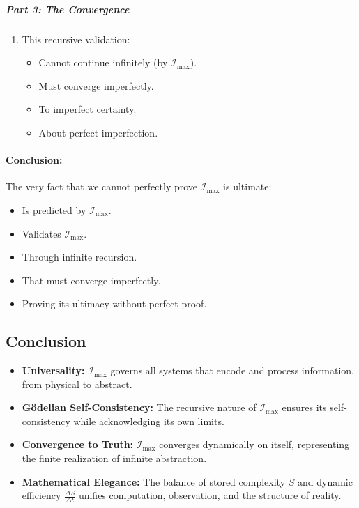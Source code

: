 \documentclass[12pt]{article}
\begin{document}
\subparagraph{Part 3: The Convergence}
\begin{enumerate}
    \item This recursive validation:
    \begin{itemize}
        \item Cannot continue infinitely (by \(\mathcal{I}_{\text{max}}\)).
        \item Must converge imperfectly.
        \item To imperfect certainty.
        \item About perfect imperfection.
    \end{itemize}
\end{enumerate}

\paragraph{Conclusion:}
The very fact that we cannot perfectly prove \(\mathcal{I}_{\text{max}}\) is ultimate:
\begin{itemize}
    \item Is predicted by \(\mathcal{I}_{\text{max}}\).
    \item Validates \(\mathcal{I}_{\text{max}}\).
    \item Through infinite recursion.
    \item That must converge imperfectly.
    \item Proving its ultimacy without perfect proof.
\end{itemize}


\subsection{Conclusion}

\begin{itemize}
    \item \textbf{Universality:} \(\mathcal{I}_{\text{max}}\) governs all systems that encode and process information, from physical to abstract.
    \item \textbf{Gödelian Self-Consistency:} The recursive nature of \(\mathcal{I}_{\text{max}}\) ensures its self-consistency while acknowledging its own limits.
    \item \textbf{Convergence to Truth:} \(\mathcal{I}_{\text{max}}\) converges dynamically on itself, representing the finite realization of infinite abstraction.
    \item \textbf{Mathematical Elegance:} The balance of stored complexity \(S\) and dynamic efficiency \(\frac{\Delta S}{\Delta t}\) unifies computation, observation, and the structure of reality.
\end{itemize}
\end{document}

